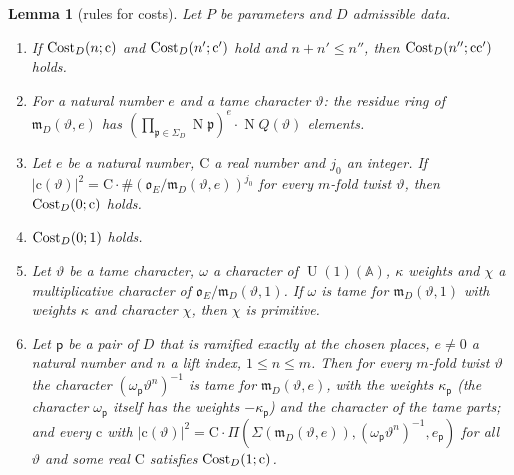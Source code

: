 \documentclass[11pt,a4paper]{article}
\theoremstyle{plainx}
\newtheorem{lemma}[theorem]{Lemma}
\theoremstyle{uprightx}
\newcommand{\pp}{\mathsf{p}}
\newcommand{\fp}{\mathfrak{p}}
\newcommand{\fm}{\mathfrak{m}}
\newcommand{\rc}{\mathrm{c}}
\newcommand{\rC}{\mathrm{C}}
\newcommand{\A}{\mathbb{A}}
\newcommand{\U}{\operatorname{U}}
\newcommand{\cO}{\mathfrak{o}}
\newcommand{\LPP}[3]{\Pi(#1,#2,#3)}
\newcommand{\Np}{\operatorname{N}}
\begin{document}
\begin{lemma}[rules for costs]\label{l:cost}
Let $P$ be parameters and $D$ admissible data.
\begin{enumerate}[label=\textup{(\alph*)},leftmargin=2.3em,itemsep=1pt]
\item If $\CostsSquares{D}{n}{\rc}$ and $\CostsSquares{D}{n'}{\rc'}$ hold and $n+n'\le n''$, then
$\CostsSquares{D}{n''}{\rc\rc'}$ holds.
\item For a natural number $e$ and a tame character $\vartheta$: the residue ring of $\fm_D(\vartheta,e)$ has
$(\prod_{\fp\in\Sigma_D}\Np\fp)^{e}\cdot\Np Q(\vartheta)$ elements.
\item Let $e$ be a natural number, $\rC$ a real number and $j_0$ an integer. If
$|\rc(\vartheta)|^2=\rC\cdot\#(\cO_E/\fm_D(\vartheta,e))^{j_0}$ for every $m$-fold twist $\vartheta$, then
$\CostsSquares{D}{0}{\rc}$ holds.
\item $\operatorname{Cost}_{D}(0;1)$ holds.
\item Let $\vartheta$ be a tame character, $\omega$ a character of $\U(1)(\A)$, $\kappa$ weights and $\chi$ a
multiplicative character of $\cO_E/\fm_D(\vartheta,1)$. If $\omega$ is tame for $\fm_D(\vartheta,1)$ with weights
$\kappa$ and character $\chi$, then $\chi$ is primitive.
\item Let $\pp$ be a pair of $D$ that is ramified exactly at the chosen places, $e\ne0$ a natural number and $n$
a lift index, $1\le n\le m$. Then for every $m$-fold twist $\vartheta$ the character
$(\omega_{\pp}\vartheta^{n})^{-1}$ is tame for $\fm_D(\vartheta,e)$, with the weights $\kappa_{\pp}$ (the character
$\omega_{\pp}$ itself has the weights $-\kappa_{\pp}$) and the character of the tame parts; and every $\rc$ with
$|\rc(\vartheta)|^2=\rC\cdot\LPP{\Sigma(\fm_D(\vartheta,e))}{(\omega_{\pp}\vartheta^{n})^{-1}}{e_{\pp}}$ for all
$\vartheta$ and some real $\rC$ satisfies $\CostsSquares{D}{1}{\rc}$.
\end{enumerate}
\end{lemma}
\end{document}
